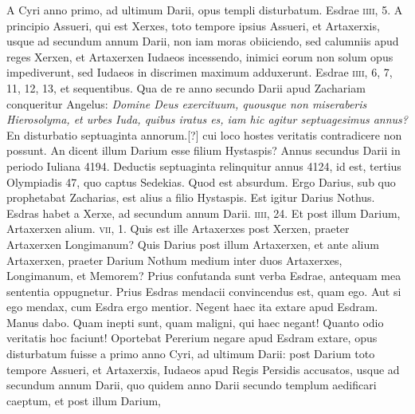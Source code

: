A Cyri anno primo, ad ultimum Darii, opus
templi disturbatum.
Esdrae \textsc{iiii}, 5.
A principio Assueri, qui est
Xerxes, toto tempore ipsius Assueri, et Artaxerxis, usque ad secundum
annum Darii, non iam moras obiiciendo, sed calumniis apud
reges Xerxen, et Artaxerxen Iudaeos incessendo, inimici eorum
non solum opus impediverunt, sed Iudaeos in discrimen maximum
adduxerunt.
Esdrae \textsc{iiii}, 6, 7, 11, 12, 13, et sequentibus.
Qua de re
anno secundo Darii apud Zachariam conqueritur Angelus: \textit{Domine
Deus exercituum, quousque non miseraberis Hierosolyma, et
urbes Iuda, quibus iratus es, iam hic agitur septuagesimus annus?}
En disturbatio septuaginta annorum.[?] cui loco hostes veritatis contradicere
non possunt.
An dicent illum Darium esse filium Hystaspis?
Annus secundus Darii in periodo Iuliana 4194. Deductis septuaginta
relinquitur annus 4124, id est, tertius Olympiadis 47,
quo captus Sedekias.
Quod est absurdum.
Ergo Darius, sub quo
prophetabat Zacharias, est alius a filio Hystaspis.
Est igitur Darius
Nothus.
Esdras habet a Xerxe, ad secundum annum Darii.
\textsc{iiii}, 24.
Et post illum Darium, Artaxerxen alium.
\textsc{vii}, 1.
Quis
est ille Artaxerxes post Xerxen, praeter Artaxerxen Longimanum?
Quis Darius post illum Artaxerxen, et ante alium Artaxerxen, praeter
Darium Nothum medium inter duos Artaxerxes, Longimanum,
et Memorem?
Prius confutanda sunt verba Esdrae, antequam
mea sententia oppugnetur.
Prius Esdras mendacii convincendus
est, quam ego.
Aut si ego mendax, cum Esdra ergo mentior.
Negent haec ita extare apud Esdram.
Manus dabo.
Quam inepti
sunt, quam maligni, qui haec negant!
Quanto odio veritatis hoc faciunt!
Oportebat Pererium negare apud Esdram extare, opus disturbatum
fuisse a primo anno Cyri, ad ultimum Darii: post Darium
toto tempore Assueri, et Artaxerxis, Iudaeos apud Regis Persidis
accusatos, usque ad secundum annum Darii, quo quidem anno
Darii secundo templum aedificari caeptum, et post illum Darium,
